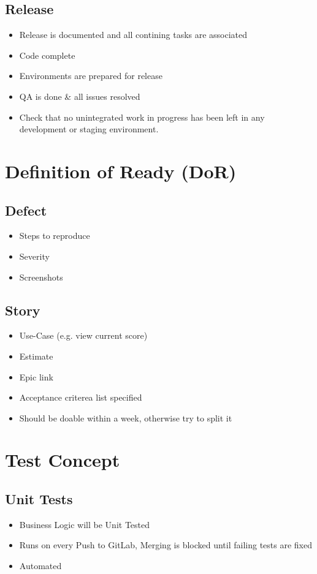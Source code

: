 \subsection{Release}
\begin{itemize}
    \item Release is documented and all contining tasks are associated 
    \item Code complete 
    \item Environments are prepared for release 
    \item QA is done \& all issues resolved 
    \item Check that no unintegrated work in progress has been left in any development or staging environment. 
\end{itemize}

\section{Definition of Ready (DoR)}

\subsection{Defect} 
\begin{itemize}
    \item Steps to reproduce 
    \item Severity 
    \item Screenshots 
\end{itemize}

\subsection{Story}
\begin{itemize}
    \item Use-Case (e.g. view current score)
    \item Estimate 
    \item Epic link 
    \item Acceptance criterea list specified 
    \item Should be doable within a week, otherwise try to split it 
\end{itemize}

\section{Test Concept}
\subsection{Unit Tests}
\begin{itemize}
    \item Business Logic will be Unit Tested
    \item Runs on every Push to GitLab, Merging is blocked until failing tests are fixed
    \item Automated
\end{itemize}

